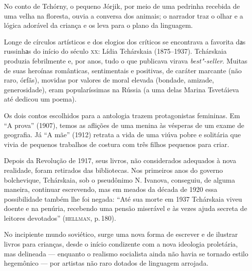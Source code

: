 No conto de Tchórny, o pequeno Jórjik, por meio de uma pedrinha recebida
de uma velha na floresta, ouvia a conversa dos animais; o narrador traz
o olhar e a lógica adorável da criança e os leva para o plano da
linguagem.

Longe de círculos artísticos e dos elogios dos críticos se encontrava a
favorita dаs russinhаs do início do século \textsc{xx}: Lídia Tchárskaia
(1875--1937). Tchárskaia produzia febrilmente e, por anos, tudo o que
publicava virava \emph{best"-seller}. Muitas de suas heroínas românticas,
sentimentais e positivas, de caráter marcante (não raro, órfãs), movidas
por valores de moral elevada (bondade, amizade, generosidade), eram
popularíssimas na Rússia (a uma delas Marina Tsvetáieva até dedicou um
poema).

Os dois contos escolhidos para a antologia trazem protagonistas
femininas. Em ``A prova'' (1907), temos as aflições de uma menina
às vésperas de um exame de geografia. Já ``A mãe'' (1912) retrata
a vida de uma viúva pobre e solitária que vivia de pequenos trabalhos de
costura com três filhos pequenos para criar.

Depois da Revolução de 1917, seus livros, não considerados adequados à
nova realidade, foram retirados das bibliotecas. Nos primeiros anos do
governo bolchevique, Tchárskaia, sob o pseudônimo N. Ivanova,
conseguiu, de alguma maneira, continuar escrevendo, mas em meados da
década de 1920 essa possibilidade também lhe foi negada: ``Até sua morte
em 1937 Tchárskaia viveu doente e na penúria, recebendo uma pensão
miserável e às vezes ajuda secreta de leitores devotados'' (\textsc{hellman}, p.\,180).

No incipiente mundo soviético, surge uma nova forma de escrever e de
ilustrar livros para crianças, desde o início condizente com a nova
ideologia proletária, mas delineada --- enquanto o realismo socialista
ainda não havia se tornado estilo hegemônico --- por artistas não raro
dotados de linguagem arrojada.

